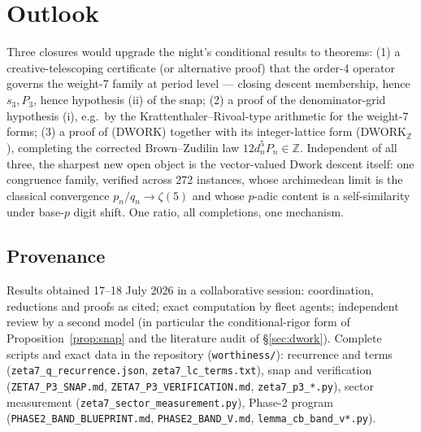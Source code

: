 \documentclass[11pt]{article}
\theoremstyle{definition}\newtheorem{remark}[theorem]{Remark}
\newcommand{\Z}{\mathbb{Z}}\newcommand{\Q}{\mathbb{Q}}\newcommand{\Fp}{\mathbb{F}_p}
\newcommand{\zt}[1]{\zeta(#1)}
\begin{document}
\section{Outlook}\label{sec:outlook}

Three closures would upgrade the night's conditional results to theorems:
(1) a creative-telescoping certificate (or alternative proof) that the order-4
operator governs the weight-7 family at period level --- closing descent
membership, hence $s_3,\hat P_3$, hence hypothesis (ii) of the snap;
(2) a proof of the denominator-grid hypothesis (i), e.g.\ by the
Krattenthaler--Rivoal-type arithmetic for the weight-7 forms;
(3) a proof of (DWORK) together with its integer-lattice form
(DWORK$_\Z$), completing the corrected Brown--Zudilin law
$12d_n^5P_n\in\Z$. Independent of all three, the sharpest new open object is
the vector-valued Dwork descent itself: one congruence family, verified across
$272$ instances, whose archimedean limit is the classical convergence
$p_n/q_n\to\zt5$ and whose $p$-adic content is a self-similarity under
base-$p$ digit shift. One ratio, all completions, one mechanism.

\subsection*{Provenance}
Results obtained 17--18 July 2026 in a collaborative session: coordination,
reductions and proofs as cited; exact computation by fleet agents; independent
review by a second model (in particular the conditional-rigor form of
Proposition~\ref{prop:snap} and the literature audit of \S\ref{sec:dwork}).
Complete scripts and exact data in the repository (\texttt{worthiness/}):
recurrence and terms (\texttt{zeta7\_q\_recurrence.json},
\texttt{zeta7\_lc\_terms.txt}), snap and verification
(\texttt{ZETA7\_P3\_SNAP.md}, \texttt{ZETA7\_P3\_VERIFICATION.md},
\texttt{zeta7\_p3\_*.py}), sector measurement
(\texttt{zeta7\_sector\_measurement.py}), Phase-2 program
(\texttt{PHASE2\_BAND\_BLUEPRINT.md}, \texttt{PHASE2\_BAND\_V.md},
\texttt{lemma\_cb\_band\_v*.py}).
\end{document}
